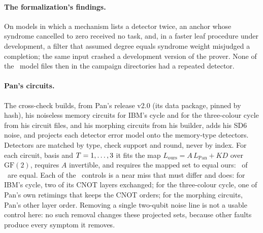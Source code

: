 \documentclass[aps,pra,twocolumn,superscriptaddress,nofootinbib,longbibliography,floatfix]{revtex4-2}
\newcommand{\GF}{\mathrm{GF}(2)}
\begin{document}
\paragraph*{The formalization's findings.} On models in which a mechanism lists a detector twice, an anchor whose syndrome cancelled to zero received no task, and, in a faster leaf procedure under development, a filter that assumed degree equals syndrome weight misjudged a completion; the same input crashed a development version of the prover. None of the \ExposureModels\ model files then in the campaign directories had a repeated detector.

\paragraph*{Pan's circuits.} The cross-check builds, from Pan's release v2.0 (its data package, pinned by hash), his noiseless memory circuits for IBM's cycle and for the three-colour cycle from his circuit files, and his morphing circuits from his builder, adds his SD6 noise, and projects each detector error model onto the memory-type detectors. Detectors are matched by type, check support and round, never by index. For each circuit, basis and $T=1,\dots,3$ it fits the map $L_{\mathrm{ours}}=A\,L_{\mathrm{Pan}}+K D$ over $\GF$, requires $A$ invertible, and requires the mapped set to equal ours: \PanXRows\ of \PanXRows\ are equal. Each of the \PanXControls\ controls is a near miss that must differ and does: for IBM's cycle, two of its CNOT layers exchanged; for the three-colour cycle, one of Pan's own retimings that keeps the CNOT orders; for the morphing circuits, Pan's other layer order. Removing a single two-qubit noise line is not a usable control here: no such removal changes these projected sets, because other faults produce every symptom it removes.


\end{document}
